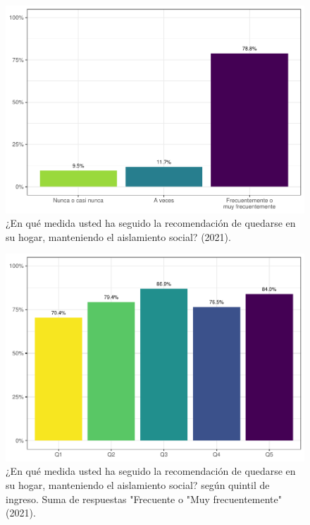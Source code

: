 \documentclass[
  12pt,
  openany]{book}
\begin{document}
\begin{figure}

{\centering \includegraphics{reporte-elsoc_files/figure-latex/dist-total-1} 

}

\caption{¿En qué medida usted ha seguido la recomendación de quedarse en su hogar, manteniendo el aislamiento social? (2021).}\label{fig:dist-total}
\end{figure}

\begin{figure}

{\centering \includegraphics{reporte-elsoc_files/figure-latex/dist-quintil-1} 

}

\caption{¿En qué medida usted ha seguido la recomendación de quedarse en su hogar, manteniendo el aislamiento social? según quintil de ingreso. Suma de respuestas "Frecuente o "Muy frecuentemente" (2021).}\label{fig:dist-quintil}
\end{figure}
\end{document}
